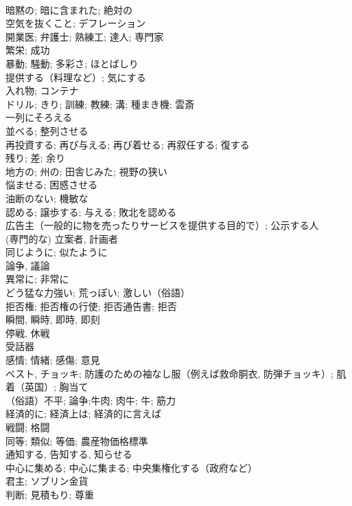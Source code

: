 \documentclass[8pt]{extreport}
\begin{document}
\begin{CJK}{UTF8}{min}
\\	暗黙の; 暗に含まれた; 絶対の	
\\	空気を抜くこと; デフレーション	
\\	開業医; 弁護士; 熟練工; 達人; 専門家	
\\	繁栄; 成功	
\\	暴動; 騒動; 多彩さ; ほとばしり	
\\	提供する（料理など）; 気にする	
\\	入れ物; コンテナ	
\\	ドリル; きり; 訓練; 教練; 溝; 種まき機; 雲斎	
\\	一列にそろえる 
\\	並べる; 整列させる	
\\	再投資する; 再び与える; 再び着せる; 再叙任する; 復する	
\\	残り; 差; 余り	
\\	地方の; 州の; 田舎じみた; 視野の狭い	
\\	悩ませる; 困惑させる	
\\	油断のない; 機敏な	
\\	認める; 譲歩する; 与える; 敗北を認める	
\\	広告主（一般的に物を売ったりサービスを提供する目的で）; 公示する人	
\\	(専門的な) 立案者, 計画者	
\\	同じように; 似たように	
\\	論争, 議論	
\\	異常に; 非常に	
\\	どう猛な力強い; 荒っぽい; 激しい（俗語）	
\\	拒否権; 拒否権の行使; 拒否通告書; 拒否	
\\	瞬間, 瞬時, 即時, 即刻	
\\	停戦, 休戦	
\\	受話器	
\\	感情; 情緒; 感傷; 意見	
\\	ベスト, チョッキ; 防護のための袖なし服（例えば救命胴衣, 防弾チョッキ）; 肌着（英国）; 胸当て	
\\	（俗語）不平; 論争;牛肉; 肉牛; 牛; 筋力	
\\	経済的に; 経済上は; 経済的に言えば	
\\	戦闘; 格闘	
\\	同等; 類似; 等価; 農産物価格標準	
\\	通知する, 告知する, 知らせる	
\\	中心に集める; 中心に集まる; 中央集権化する（政府など）	
\\	君主; ソブリン金貨	
\\	判断; 見積もり; 尊重	

\end{CJK}
\end{document}

